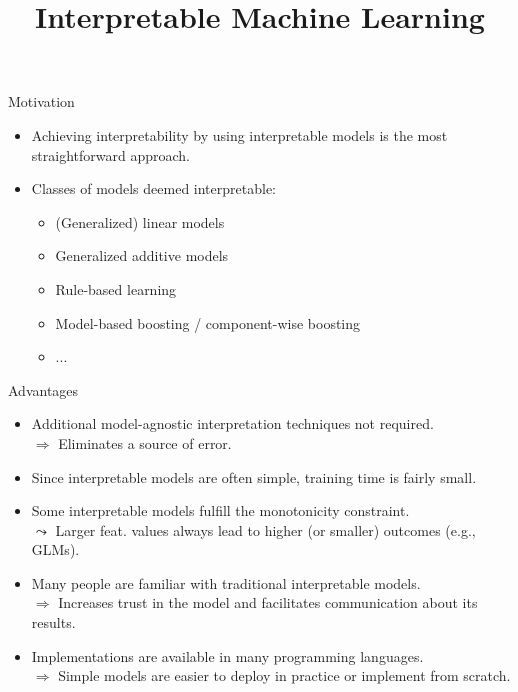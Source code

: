 \documentclass[10pt,compress,t,notes=noshow, xcolor=table]{beamer}
\title{Interpretable Machine Learning}
\date{}
\begin{document}


\begin{frame}{Motivation}

    \begin{itemize}
        \item Achieving interpretability by using interpretable models is the most straightforward approach.
        \bigskip
        \item Classes of models deemed interpretable:
        \begin{itemize}
            \item (Generalized) linear models
            \item Generalized additive models
            \item Rule-based learning
            \item Model-based boosting / component-wise boosting
            \item ...
        \end{itemize}
    \end{itemize}

\end{frame}

\begin{frame}{Advantages}

    \begin{itemize}[<+->]
    \itemsep1em
        \item Additional model-agnostic interpretation techniques not required.\\
        $\Rightarrow$ Eliminates a source of error.
        \item Since interpretable models are often simple, training time is fairly small.
        \item Some interpretable models fulfill the monotonicity constraint.\\
        $\leadsto$ Larger feat. values always lead to higher (or smaller) outcomes (e.g., GLMs).
        \item Many people are familiar with traditional interpretable models.\\
        $\Rightarrow$ Increases trust in the model and facilitates communication about its results.
        \item Implementations are available in many programming languages. \\
        $\Rightarrow$ Simple models are easier to deploy in practice or implement from scratch.
    \end{itemize}

\end{frame}
\end{document}

